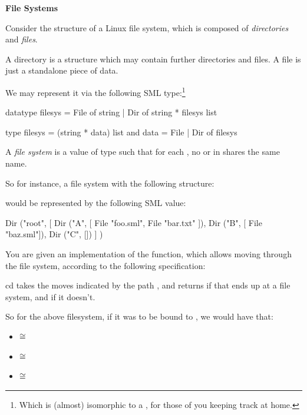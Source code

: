 \documentclass[addpoints,12pt]{exam}
\begin{document}
\begin{questions}
\newpage
{}

\textbf{File Systems}

Consider the structure of a Linux file system, which is composed of \textit{directories}
and \textit{files}.

A directory is a structure which may contain further directories and files. A file
is just a standalone piece of data.

We may represent it via the following SML type:\footnote{Which is (almost) isomorphic to
a , for those of you keeping track at home.}
\begin{codeblock}
  datatype filesys =
      File of string
    | Dir of string * filesys list

  type filesys = (string * data) list
  and data = File | Dir of filesys
\end{codeblock}

A \textit{file system} is a value of type  such that for each
, no  or  in  shares the
same name.

So for instance, a file system with the following structure:

\begin{minipage}{\linewidth} %
\end{minipage}

would be represented by the following SML value:
\begin{codeblock}
  Dir ("root",
    [ Dir ("A", [ File "foo.sml", File "bar.txt" ]),
      Dir ("B", [ File "baz.sml"]),
      Dir ("C", [])
    ]
  )
\end{codeblock}

\newpage

You are given an implementation of the  function, which allows
moving through the file system, according to the following specification:

\spec
  {cd}
  {}
  {}
  { takes the moves indicated by the path ,
  and returns  if that ends up at a file system,
  and  if it doesn't.}

So for the above filesystem, if it was to be bound to , we would
have that:
\begin{itemize}
  \item {} $\cong$ 
  \item {} $\cong$ 
  \item {} $\cong$ 
\end{itemize}


\end{questions}
\end{document}
